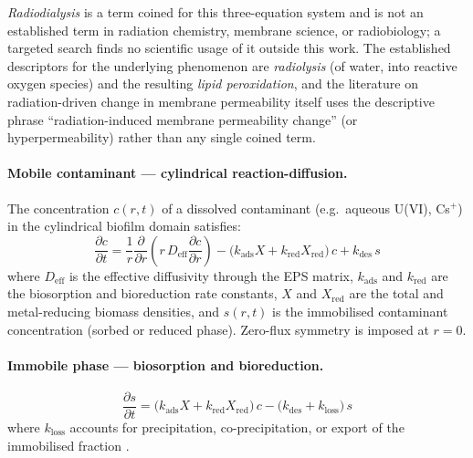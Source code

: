 \documentclass[11pt]{article}
\begin{document}
\emph{Radiodialysis} is a term coined for this three-equation system and is not an
established term in radiation chemistry, membrane science, or radiobiology; a targeted
search finds no scientific usage of it outside this work. The established descriptors for
the underlying phenomenon are \emph{radiolysis} (of water, into reactive oxygen species) and
the resulting \emph{lipid peroxidation}, and the literature on radiation-driven change in
membrane permeability itself uses the descriptive phrase ``radiation-induced membrane
permeability change'' (or hyperpermeability) rather than any single coined term.

\paragraph{Mobile contaminant --- cylindrical reaction-diffusion.}
The concentration $c(r,t)$ of a dissolved contaminant (e.g.\ aqueous U(VI), Cs$^+$) in the
cylindrical biofilm domain satisfies:
\begin{equation}
\frac{\partial c}{\partial t}
  = \frac{1}{r}\frac{\partial}{\partial r}\!\left(r\,D_{\mathrm{eff}}\frac{\partial c}{\partial r}\right)
  - \bigl(k_{\mathrm{ads}}X + k_{\mathrm{red}}X_{\mathrm{red}}\bigr)\,c
  + k_{\mathrm{des}}\,s
\label{eq:mobile}
\end{equation}
where $D_{\mathrm{eff}}$ is the effective diffusivity through the EPS matrix,
$k_{\mathrm{ads}}$ and $k_{\mathrm{red}}$ are the biosorption and bioreduction rate constants,
$X$ and $X_{\mathrm{red}}$ are the total and metal-reducing biomass densities, and $s(r,t)$
is the immobilised contaminant concentration (sorbed or reduced phase).
Zero-flux symmetry is imposed at $r = 0$.

\paragraph{Immobile phase --- biosorption and bioreduction.}
\begin{equation}
\frac{\partial s}{\partial t}
  = \bigl(k_{\mathrm{ads}}X + k_{\mathrm{red}}X_{\mathrm{red}}\bigr)\,c
  - \bigl(k_{\mathrm{des}} + k_{\mathrm{loss}}\bigr)\,s
\label{eq:immobile}
\end{equation}
where $k_{\mathrm{loss}}$ accounts for precipitation, co-precipitation, or export of the
immobilised fraction \cite{renslow2017}.
\end{document}
